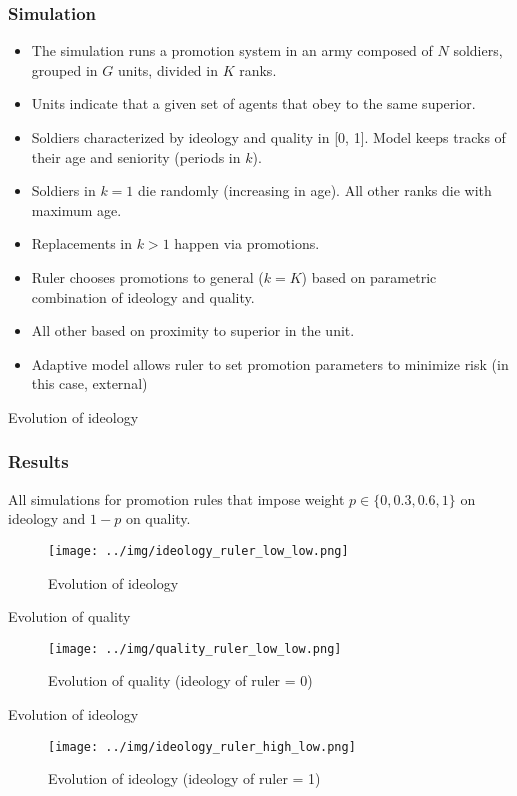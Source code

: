 \documentclass[9pt]{beamer}
\begin{document}
\begin{frame}
  \frametitle{Simulation}
  \begin{itemize}
  \item The simulation runs a promotion system in an army composed of $N$ soldiers,
    grouped in $G$ units, divided in $K$ ranks. 
  \item Units indicate that a given set of agents that obey to the same
    superior.
  \item Soldiers characterized by ideology and quality in [0, 1]. Model keeps
    tracks of their age and seniority (periods in $k$). 
  \item Soldiers in $k=1$ die randomly (increasing in age). All other ranks die
    with maximum age. 
  \item Replacements in $k>1$ happen via promotions. 
  \item Ruler chooses promotions to general ($k=K$) based on parametric
    combination of ideology and quality.
  \item All other based on proximity to superior in the unit.
  \item Adaptive model allows ruler to set promotion parameters to minimize risk
    (in this case, external)
  \end{itemize}
\end{frame}

\begin{frame}{Evolution of ideology}
  \frametitle{Results}
  All simulations for promotion rules that impose weight $p \in \{0, 0.3, 0.6,
  1\}$ on ideology and $1 - p$ on quality. 
  \begin{figure}[!h]
    \texttt{[image: ../img/ideology\_ruler\_low\_low.png]}
    \caption{Evolution of ideology}
  \end{figure}
\end{frame}

\begin{frame}{Evolution of quality}  
  \begin{figure}[!h]
    \centering
    \texttt{[image: ../img/quality\_ruler\_low\_low.png]}
    \label{fig:quality_low_low}
    \caption{Evolution of quality (ideology of ruler = 0)}
  \end{figure}
\end{frame}

\begin{frame}{Evolution of ideology}
  \begin{figure}[!h]
  \centering
  \texttt{[image: ../img/ideology\_ruler\_high\_low.png]}
  \caption{Evolution of ideology (ideology of ruler = 1)}
\end{figure}
\end{frame}
\end{document}
